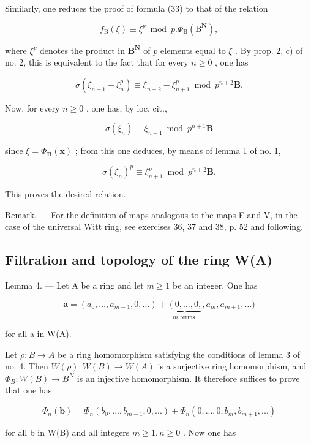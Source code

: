 Similarly, one reduces the proof of formula (33) to that of the relation

\[
f _ {\mathrm{B}} (\xi) \equiv \xi^ {p} \bmod p. \Phi_ {\mathrm{B}} (\mathrm{B} ^ {\mathbf {N}}),
\]

where \(\xi^{p}\) denotes the product in \(\mathbf{B}^{\mathbf{N}}\) of \(p\) elements equal to \(\xi\) . By prop. 2, c) of no. 2, this is equivalent to the fact that for every \(n \geqslant 0\) , one has

\[
\sigma \left(\xi_ {n + 1} - \xi_ {n} ^ {p}\right) \equiv \xi_ {n + 2} - \xi_ {n + 1} ^ {p} \bmod p ^ {n + 2} \mathbf {B}.
\]

Now, for every \(n \geqslant 0\) , one has, by loc. cit.,

\[
\sigma (\xi_ {n}) \equiv \xi_ {n + 1} \bmod p ^ {n + 1} \mathbf {B}
\]

since \(\xi = \Phi_{\mathbf{B}}(\boldsymbol{x})\) ; from this one deduces, by means of lemma 1 of no. 1,

\[
\sigma (\xi_ {n}) ^ {p} \equiv \xi_ {n + 1} ^ {p} \bmod p ^ {n + 2} \mathbf {B}.
\]

This proves the desired relation.

Remark. --- For the definition of maps analogous to the maps F and V, in the case of the universal Witt ring, see exercises 36, 37 and 38, p. 52 and following.

\subsection{Filtration and topology of the ring W(A)}

Lemma 4. --- Let A be a ring and let \(m \geqslant 1\) be an integer. One has

\[
\boldsymbol {a} = \left(a _ {0}, \dots , a _ {m - 1}, 0, \dots\right) + \underbrace {\left(0 , \dots , 0 , \right.} _ {m \text { terms }}, a _ {m}, a _ {m + 1}, \dots)\tag{34}
\]

for all a in W(A).

Let \(\rho: B \to A\) be a ring homomorphism satisfying the conditions of lemma 3 of no. 4. Then \(W(\rho): W(B) \to W(A)\) is a surjective ring homomorphism, and \(\Phi_B: W(B) \to B^N\) is an injective homomorphism. It therefore suffices to prove that one has

\[
\Phi_ {n} (\boldsymbol {b}) = \Phi_ {n} (b _ {0},..., b _ {m - 1}, 0,...) + \Phi_ {n} (0,..., 0, b _ {m}, b _ {m + 1},...) \tag{35}
\]

for all b in W(B) and all integers \(m \geqslant 1, n \geqslant 0\) . Now one has

